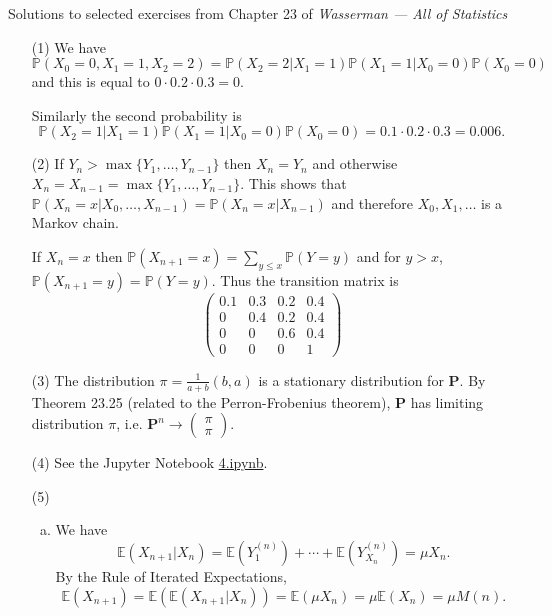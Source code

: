 \documentclass[10pt]{article}
\renewcommand{\P}{\mathbb{P}}
\newcommand{\E}{\mathbb{E}}
\begin{document}
\noindent \large{Solutions to selected exercises from Chapter 23 of
\emph{Wasserman --- All of Statistics}}

\begin{enumerate}[(1)]

\item[(1)]
We have
\[
    \P(X_0=0,X_1=1,X_2=2) = \P(X_2=2 | X_1=1) \P(X_1=1|X_0=0) \P(X_0=0)
\]
and this is equal to $0 \cdot 0.2 \cdot 0.3=0$.

Similarly the second probability is
\[
    \P(X_2=1|X_1=1) \P(X_1=1|X_0=0) \P(X_0=0) = 0.1 \cdot 0.2 \cdot 0.3 = 0.006.
\]

\item[(2)]
If $Y_n>\max\{Y_1,\ldots,Y_{n-1}\}$ then $X_n=Y_n$ and otherwise
$X_n=X_{n-1}=\max\{Y_1,\ldots,Y_{n-1}\}$. This shows that
$\P(X_n=x|X_0,\ldots,X_{n-1}) = \P(X_n=x|X_{n-1})$ and therefore
$X_0,X_1,\ldots$ is a Markov chain.

If $X_n=x$ then $\P(X_{n+1}=x) = \sum_{y\leq x} \P(Y=y)$ and
for $y>x$, $\P(X_{n+1}=y)=\P(Y=y)$. Thus the transition matrix is
\[
    \begin{pmatrix}
        0.1 & 0.3 & 0.2 & 0.4 \\
        0 & 0.4 & 0.2 & 0. 4 \\
        0 & 0 & 0.6 & 0.4 \\
        0 & 0 & 0 & 1
    \end{pmatrix}
\]

\item[(3)]
The distribution $\pi = \frac{1}{a+b}(b,a)$ is a stationary distribution
for $\mathbf P$. By Theorem 23.25 (related to the Perron-Frobenius
theorem), $\mathbf P$ has limiting distribution $\pi$, i.e.
$\mathbf P^n\to \begin{pmatrix} \pi \\ \pi \end{pmatrix}$.

\item[(4)]
See the Jupyter Notebook
\href{https://github.com/ajrasmus/some_of_statistics/blob/main/chapter_23/4.ipynb}{4.ipynb}.


\item[(5)]
\begin{enumerate}[(a)]
\item We have
\[
    \E(X_{n+1}|X_n) = \E\left(Y_1^{(n)}\right) + \cdots +
    \E\left(Y_{X_n}^{(n)}\right) = \mu X_n.
\]
By the Rule of Iterated Expectations,
\[
    \E(X_{n+1}) = \E(\E(X_{n+1}|X_n)) = \E(\mu X_n) = \mu \E(X_n) = \mu M(n).
\]


\end{enumerate}
\end{enumerate}
\end{document}

